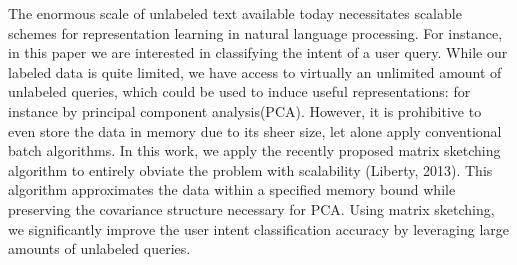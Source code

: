 The enormous scale of unlabeled text available today necessitates scalable schemes for representation learning in natural language processing. For instance, in this paper we are interested in classifying the intent of a user query. While our labeled data is quite limited, we have access to virtually an unlimited amount of unlabeled queries, which could be used to induce useful representations: for instance by principal component analysis(PCA). However, it is prohibitive to even store the data in memory due to its sheer size, let alone apply conventional batch algorithms. In this work, we apply the recently proposed matrix sketching algorithm to entirely obviate the problem with scalability (Liberty, 2013). This algorithm approximates the data within a specified memory bound while preserving the covariance structure necessary for PCA. Using matrix sketching, we significantly improve the user intent classification accuracy by leveraging large amounts of unlabeled queries.
